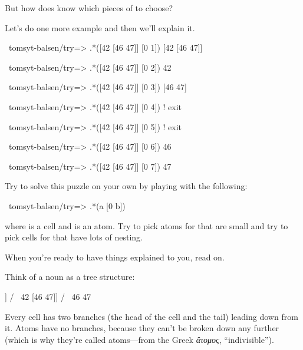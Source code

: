 But how does  \kode{*[a [0 b]]} know which pieces of  to choose?

Let's do one more example and then we'll explain it.
\begin{code}
~tomsyt-balsen/try=> .*([42 [46 47]] [0 1])
[42 [46 47]]

~tomsyt-balsen/try=> .*([42 [46 47]] [0 2])
42

~tomsyt-balsen/try=> .*([42 [46 47]] [0 3])
[46 47]

~tomsyt-balsen/try=> .*([42 [46 47]] [0 4])
! exit

~tomsyt-balsen/try=> .*([42 [46 47]] [0 5])
! exit

~tomsyt-balsen/try=> .*([42 [46 47]] [0 6])
46

~tomsyt-balsen/try=> .*([42 [46 47]] [0 7])
47
\end{code}
Try to solve this puzzle on your own by playing with the following:
\begin{code}
~tomsyt-balsen/try=> .*(a [0 b])
\end{code}
where  is a cell and  is an atom. Try to pick atoms for  that are
small and try to pick cells for  that have lots of nesting.

When you're ready to have things explained to you, read on.

Think of a noun as a tree structure:
\begin{code}
  [42 [46 47]]
  /       \
42      [46 47]]
          / \
        46   47
\end{code}

Every cell has two branches (the head of the cell and the tail) leading down
from it. Atoms have no branches, because they can't be broken down any further
(which is why they're called atoms---from the Greek \emph{\textgreek{ἄτομος}}, ``indivisible'').

